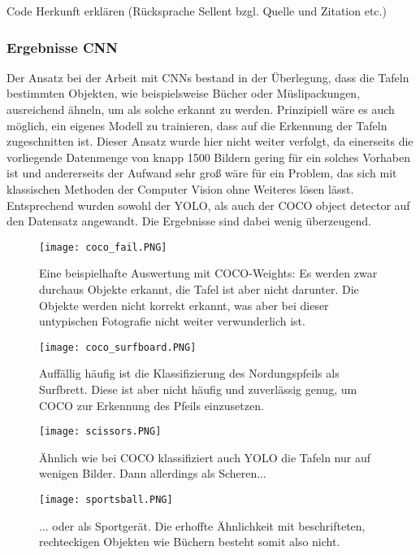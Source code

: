 Code Herkunft erklären (Rücksprache Sellent bzgl. Quelle und Zitation etc.)\\

\subsubsection{Ergebnisse CNN}

Der Ansatz bei der Arbeit mit CNNs bestand in der Überlegung, dass die Tafeln bestimmten Objekten, wie beispielsweise Bücher oder Müslipackungen, ausreichend ähneln, um als solche erkannt zu werden. Prinzipiell wäre es auch möglich, ein eigenes Modell zu trainieren, dass auf die Erkennung der Tafeln zugeschnitten ist. Dieser Ansatz wurde hier nicht weiter verfolgt, da einerseits die vorliegende Datenmenge von knapp 1500 Bildern gering für ein solches Vorhaben ist und andererseits der Aufwand sehr groß wäre für ein Problem, das sich mit klassischen Methoden der Computer Vision ohne Weiteres lösen lässt.\\
Entsprechend wurden sowohl der YOLO, als auch der COCO object detector auf den Datensatz angewandt. Die Ergebnisse sind dabei wenig überzeugend.

\begin{SCfigure}[0.75][h!]
\caption{Eine beispielhafte Auswertung mit COCO-Weights: Es werden zwar durchaus Objekte erkannt, die Tafel ist aber nicht darunter. Die Objekte werden nicht korrekt erkannt, was aber bei dieser untypischen Fotografie nicht weiter verwunderlich ist.}
\texttt{[image: coco\_fail.PNG]}
\end{SCfigure}

\begin{SCfigure}[0.75][h!]
\caption{Auffällig häufig ist die Klassifizierung des Nordungspfeils als Surfbrett. Diese ist aber nicht häufig und zuverlässig genug, um COCO zur Erkennung des Pfeils einzusetzen.}
\texttt{[image: coco\_surfboard.PNG]}
\end{SCfigure}

\begin{SCfigure}[0.75][h!]
\caption{Ähnlich wie bei COCO klassifiziert auch YOLO die Tafeln nur auf wenigen Bilder. Dann allerdings als Scheren...}
\texttt{[image: scissors.PNG]}
\end{SCfigure}

\begin{SCfigure}[0.75][h!]
\caption{... oder als Sportgerät. Die erhoffte Ähnlichkeit mit beschrifteten, rechteckigen Objekten wie Büchern besteht somit also nicht.}
\texttt{[image: sportsball.PNG]}
\end{SCfigure}

